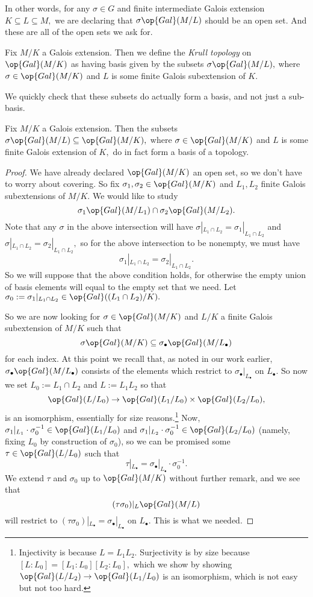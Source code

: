 In other words, for any $\sigma\in G$ and finite intermediate Galois extension $K\subseteq L\subseteq M,$ we are declaring that $\sigma\op{Gal}(M/L)$ should be an open set. And these are all of the open sets we ask for.
\begin{defi}
	Fix $M/K$ a Galois extension. Then we define the \textit{Krull topology} on $\op{Gal}(M/K)$ as having basis given by the subsets $\sigma\op{Gal}(M/L),$ where $\sigma\in\op{Gal}(M/K)$ and $L$ is some finite Galois {sub}extension of $K.$
\end{defi}
We quickly check that these subsets do actually form a basis, and not just a sub-basis.
\begin{lemma}
	Fix $M/K$ a Galois extension. Then the subsets $\sigma\op{Gal}(M/L)\subseteq\op{Gal}(M/K),$ where $\sigma\in\op{Gal}(M/K)$ and $L$ is some finite Galois extension of $K,$ do in fact form a basis of a topology.
\end{lemma}
\begin{proof}
	We have already declared $\op{Gal}(M/K)$ an open set, so we don't have to worry about covering. So fix $\sigma_1,\sigma_2\in\op{Gal}(M/K)$ and $L_1,L_2$ finite Galois sub{extensions} of $M/K.$ We would like to study
	\[\sigma_1\op{Gal}(M/L_1)\cap\sigma_2\op{Gal}(M/L_2).\]
	Note that any $\sigma$ in the above intersection will have $\sigma|_{L_1\cap L_2}=\sigma_1|_{L_1\cap L_2}$ and $\sigma|_{L_1\cap L_2}=\sigma_2|_{L_1\cap L_2},$ so for the above intersection to be nonempty, we must have
	\[\sigma_1|_{L_1\cap L_2}=\sigma_2|_{L_1\cap L_2}.\]
	So we will suppose that the above condition holds, for otherwise the empty union of basis elements will equal to the empty set that we need. Let $\sigma_0:=\sigma_1|_{L_1\cap L_2}\in\op{Gal}((L_1\cap L_2)/K).$

	So we are now looking for $\sigma\in\op{Gal}(M/K)$ and $L/K$ a finite Galois {sub}extension of $M/K$ such that
	\[\sigma\op{Gal}(M/K)\subseteq\sigma_\bullet\op{Gal}(M/L_\bullet)\]
	for each index. At this point we recall that, as noted in our work earlier, $\sigma_\bullet\op{Gal}(M/L_\bullet)$ consists of the elements which restrict to $\sigma_\bullet|_{L_\bullet}$ on $L_\bullet.$ So now we set $L_0:=L_1\cap L_2$ and $L:=L_1L_2$ so that
	\[\op{Gal}(L/L_0)\to\op{Gal}(L_1/L_0)\times\op{Gal}(L_2/L_0),\]
	is an isomorphism, essentially for size reasons.\footnote{Injectivity is because $L=L_1L_2.$ Surjectivity is by size because $[L:L_0]=[L_1:L_0][L_2:L_0],$ which we show by showing $\op{Gal}(L/L_2)\to\op{Gal}(L_1/L_0)$ is an isomorphism, which is not easy but not too hard.} Now, $\sigma_1|_{L_1}\cdot\sigma_0^{-1}\in\op{Gal}(L_1/L_0)$ and $\sigma_1|_{L_2}\cdot\sigma_0^{-1}\in\op{Gal}(L_2/L_0)$ (namely, fixing $L_0$ by construction of $\sigma_0$), so we can be promised some $\tau\in\op{Gal}(L/L_0)$ such that
	\[\tau|_{L_\bullet}=\sigma_\bullet|_{L_\bullet}\cdot\sigma_0^{-1}.\]
	We extend $\tau$ and $\sigma_0$ up to $\op{Gal}(M/K)$ without further remark, and we see that
	\[(\tau\sigma_0)|_{L}\op{Gal}(M/L)\]
	will restrict to $(\tau\sigma_0)|_{L_\bullet}=\sigma_\bullet|_{L_\bullet}$ on $L_\bullet.$ This is what we needed.
\end{proof}
